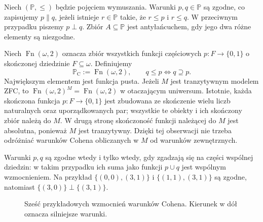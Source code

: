 \begin{definicja}\label{def:forcing-compatible}
Niech $(\mathbb P,\leq)$ będzie pojęciem wymuszania.
Warunki $p,q\in\mathbb P$ są zgodne, co zapisujemy
$p\parallel q$, jeżeli istnieje $r\in\mathbb P$
takie, że $r\leq p$ i $r\leq q$.
W przeciwnym przypadku piszemy $p\perp q$.
Zbiór $A\subseteq\mathbb P$ jest antyłańcuchem,
gdy jego dwa różne elementy są niezgodne.
\end{definicja}

\begin{przyklad}
\label{ex:cohen-poset}
Niech $\operatorname{Fn}(\omega,2)$ oznacza zbiór
wszystkich funkcji częściowych
$p:F\to\{0,1\}$ o skończonej dziedzinie
$F\subseteq\omega$. Definiujemy
\[
 \mathbb P_{\mathrm C}:=\operatorname{Fn}(\omega,2),
 \qquad q\leq p\iff q\supseteq p.
\]
Największym elementem jest funkcja pusta.
Jeżeli $M$ jest tranzytywnym modelem ZFC, to
$\operatorname{Fn}(\omega,2)^M
=\operatorname{Fn}(\omega,2)$ w otaczającym uniwersum.
Istotnie, każda skończona funkcja
$p\colon F\to\{0,1\}$ jest zbudowana ze
skończenie wielu liczb naturalnych oraz
uporządkowanych par; wszystkie te obiekty
i ich skończony zbiór należą do $M$.
W drugą stronę skończoność funkcji należącej
do $M$ jest absolutna, ponieważ $M$
jest tranzytywny. Dzięki tej obserwacji
nie trzeba odróżniać warunków Cohena
obliczanych w $M$ od warunków zewnętrznych.

Warunki $p,q$ są zgodne wtedy i tylko wtedy,
gdy zgadzają się na części wspólnej dziedzin:
w takim przypadku ich suma jako funkcji
$p\cup q$ jest wspólnym wzmocnieniem.
Na przykład
$\{(0,0),(3,1)\}$ i $\{(1,1),(3,1)\}$
są zgodne, natomiast
$\{(3,0)\}\perp\{(3,1)\}$.
\end{przyklad}

\begin{figure}[htbp]
\centering
{}
\caption{Sześć przykładowych wzmocnień warunków Cohena.
Kierunek w dół oznacza silniejsze warunki.}
\label{fig:forcing-cohen-tree}
\end{figure}

